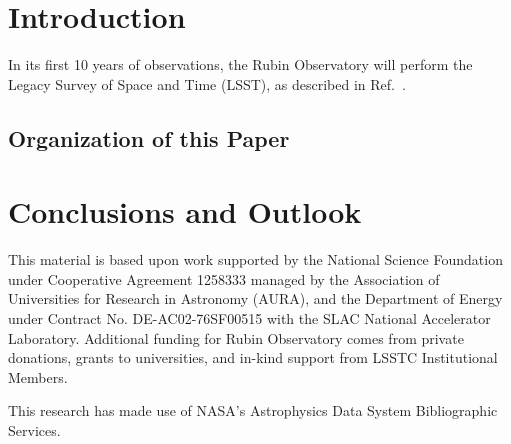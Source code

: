 \section{Introduction}

In its first 10 years of observations, the Rubin Observatory will perform the Legacy Survey of Space and Time (LSST), as described
in Ref.~. 

\subsection{Organization of this Paper}


\section{Conclusions and Outlook}
\label{sec:conclusions}


\acknowledgments
This material is based upon work supported by the National Science Foundation under Cooperative Agreement 1258333 managed by the Association of Universities for Research in Astronomy (AURA), and the Department of Energy under Contract No. DE-AC02-76SF00515 with the SLAC National Accelerator Laboratory. 
Additional funding for Rubin Observatory comes from private donations, grants to universities, and in-kind support from LSSTC Institutional Members.

This research has made use of  NASA's Astrophysics Data System Bibliographic Services.
